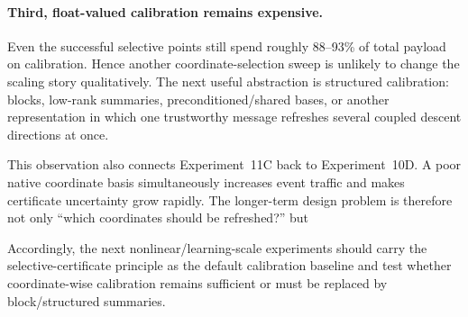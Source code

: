 \paragraph{Third, float-valued calibration remains expensive.}
Even the successful selective points still spend roughly 88--93\% of total payload on calibration. Hence another coordinate-selection sweep is unlikely to change the scaling story qualitatively. The next useful abstraction is structured calibration: blocks, low-rank summaries, preconditioned/shared bases, or another representation in which one trustworthy message refreshes several coupled descent directions at once.

This observation also connects Experiment~11C back to Experiment~10D. A poor native coordinate basis simultaneously increases event traffic and makes certificate uncertainty grow rapidly. The longer-term design problem is therefore not only ``which coordinates should be refreshed?'' but
\begin{center}
\end{center}

Accordingly, the next nonlinear/learning-scale experiments should carry the selective-certificate principle as the default calibration baseline and test whether coordinate-wise calibration remains sufficient or must be replaced by block/structured summaries.
